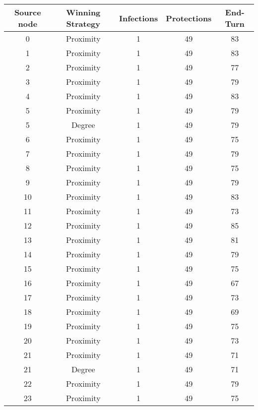 \documentclass[results.tex]{subfiles}
\begin{document}
\begin{center}
  \begin{tabular}{| c || c | c | c | c |}
    \hline
    {\bfseries Source node} & {\bfseries Winning Strategy} & {\bfseries Infections} & {\bfseries Protections} & {\bfseries End-Turn} \\  %
    \hline\hline
    0 & Proximity & 1 & 49 & 83 \\ 
    \hline
    1 & Proximity & 1 & 49 & 83 \\ 
    \hline
    2 & Proximity & 1 & 49 & 77 \\ 
    \hline
    3 & Proximity & 1 & 49 & 79 \\ 
    \hline
    4 & Proximity & 1 & 49 & 83 \\ 
    \hline
    5 & Proximity & 1 & 49 & 79 \\ 
    \hline
    5 & Degree & 1 & 49 & 79 \\ 
    \hline
    6 & Proximity & 1 & 49 & 75 \\ 
    \hline
    7 & Proximity & 1 & 49 & 79 \\ 
    \hline
    8 & Proximity & 1 & 49 & 75 \\ 
    \hline
    9 & Proximity & 1 & 49 & 79 \\ 
    \hline
    10 & Proximity & 1 & 49 & 83 \\ 
    \hline
    11 & Proximity & 1 & 49 & 73 \\ 
    \hline
    12 & Proximity & 1 & 49 & 85 \\ 
    \hline
    13 & Proximity & 1 & 49 & 81 \\ 
    \hline
    14 & Proximity & 1 & 49 & 79 \\ 
    \hline
    15 & Proximity & 1 & 49 & 75 \\ 
    \hline
    16 & Proximity & 1 & 49 & 67 \\ 
    \hline
    17 & Proximity & 1 & 49 & 73 \\ 
    \hline
    18 & Proximity & 1 & 49 & 69 \\ 
    \hline
    19 & Proximity & 1 & 49 & 75 \\ 
    \hline
    20 & Proximity & 1 & 49 & 73 \\ 
    \hline
    21 & Proximity & 1 & 49 & 71 \\ 
    \hline
    21 & Degree & 1 & 49 & 71 \\ 
    \hline
    22 & Proximity & 1 & 49 & 79 \\ 
    \hline
    23 & Proximity & 1 & 49 & 75 \\ 

\end{tabular}
\end{center}
\end{document}
